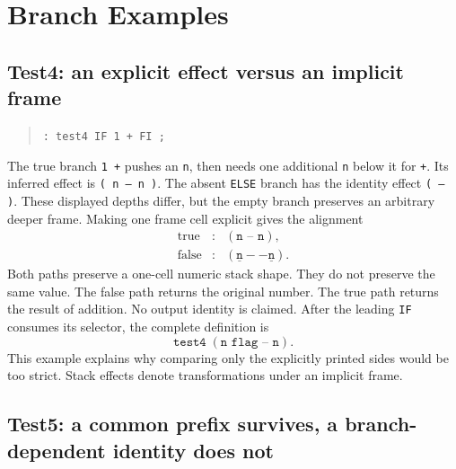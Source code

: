 \documentclass[11pt,a4paper]{article}
\newcommand{\effect}[1]{\mbox{\texttt{#1}}}
\begin{document}
\section{Branch Examples}
\label{sec:branch-examples}

\subsection{Test4: an explicit effect versus an implicit frame}

\begin{quote}
\texttt{: test4  IF 1 + FI ;}
\end{quote}
The true branch \texttt{1 +} pushes an \texttt{n}, then needs one additional
\texttt{n} below it for \texttt{+}.  Its inferred effect is
\effect{( n -- n )}.  The absent \texttt{ELSE} branch has the identity effect
\effect{( -- )}.  These displayed depths differ, but the empty branch preserves
an arbitrary deeper frame.  Making one frame cell explicit gives the
alignment
\[
\begin{array}{rcl}
 \text{true}  &:& (\texttt{n -- n}),\\
 \text{false} &:& (\underline{\texttt{n}} --
                       \underline{\texttt{n}}).
\end{array}
\]
Both paths preserve a one-cell numeric stack shape.  They do not preserve the
same value.  The false path returns the original number.  The true path returns
the result of addition.  No output identity is claimed.
After the leading \texttt{IF} consumes its selector, the complete definition is
\[
                    \texttt{test4}\;(\texttt{n flag -- n}).
\]
This example explains why comparing only the explicitly printed sides would be
too strict.  Stack effects denote transformations under an implicit frame.

\subsection{Test5: a common prefix survives, a branch-dependent
identity does not}
\end{document}
